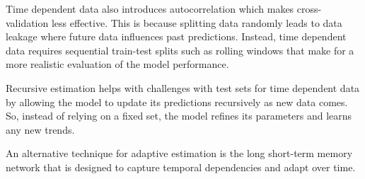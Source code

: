 \documentclass[
]{article}
\begin{document}
Time dependent data also introduces autocorrelation which makes
cross-validation less effective. This is because splitting data randomly
leads to data leakage where future data influences past predictions.
Instead, time dependent data requires sequential train-test splits such
as rolling windows that make for a more realistic evaluation of the
model performance.

Recursive estimation helps with challenges with test sets for time
dependent data by allowing the model to update its predictions
recursively as new data comes. So, instead of relying on a fixed set,
the model refines its parameters and learns any new trends.

An alternative technique for adaptive estimation is the long short-term
memory network that is designed to capture temporal dependencies and
adapt over time.
\end{document}
